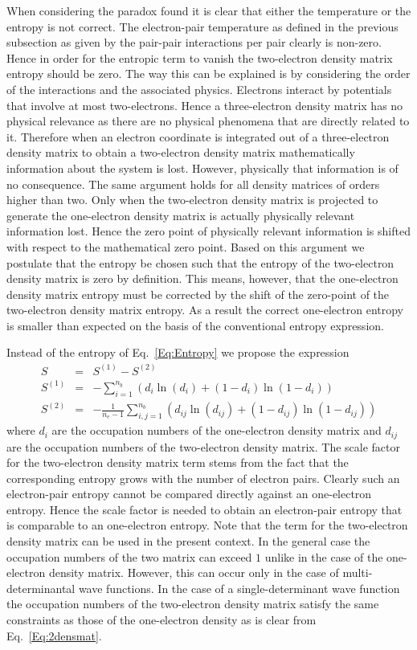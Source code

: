 \documentclass[pra]{revtex4-1}
\begin{document}
When considering the paradox found it is clear that either the temperature
or the entropy is not correct. The electron-pair temperature as defined in the
previous subsection as given by the pair-pair interactions per pair clearly is
non-zero. Hence in order for the entropic term to vanish the two-electron 
density matrix entropy should be zero. The way this can be explained is by
considering the order of the interactions and the associated physics. Electrons
interact by potentials that involve at most two-electrons. Hence a
three-electron density matrix has no physical relevance as there are no 
physical phenomena that are directly related to it. Therefore when an 
electron coordinate is integrated out of a three-electron density matrix to 
obtain a two-electron density matrix mathematically information about the system
is lost. However, physically that information is of no consequence. The same
argument holds for all density matrices of orders higher than two. Only when
the two-electron density matrix is projected to generate the one-electron
density matrix is actually physically relevant information lost. Hence the
zero point of physically relevant information is shifted with respect to the
mathematical zero point. Based on this argument we postulate that the entropy
be chosen such that the entropy of the two-electron density matrix is zero
by definition. This means, however, that the one-electron density matrix 
entropy must be corrected by the shift of the zero-point of the two-electron
density matrix entropy. As a result the correct one-electron entropy is smaller
than expected on the basis of the conventional entropy expression.

Instead of the entropy of Eq.~\ref{Eq:Entropy} we propose the expression
\begin{eqnarray}
   S &=& S^{(1)} - S^{(2)}
   \label{Eq:Entropy12} \\
   S^{(1)} &=& 
     -\sum_{i=1}^{n_b}
         \left(d_i\ln(d_i) + (1-d_i)\ln(1-d_i) \right)
   \label{Eq:Entropy1} \\
   S^{(2)} &=& 
     -   \frac{1}{n_e-1}\sum_{i,j=1}^{n_b}
         \left(d_{ij}\ln(d_{ij}) + (1-d_{ij})\ln(1-d_{ij}) \right)
   \label{Eq:Entropy2}
\end{eqnarray}
where $d_i$ are the occupation numbers of the one-electron density matrix and
$d_{ij}$ are the occupation numbers of the two-electron density matrix.
The scale factor for the two-electron density matrix term stems from the fact
that the corresponding entropy grows with the number of electron pairs. Clearly
such an electron-pair entropy cannot be compared directly against an 
one-electron entropy. Hence the scale factor is needed to obtain an 
electron-pair entropy that is comparable to an one-electron entropy.
Note that the term for the two-electron density matrix can be used in the
present context. In the general case the occupation numbers of the two matrix
can exceed $1$ unlike in the case of the one-electron density matrix. However,
this can occur only in the case of multi-determinantal wave functions. In the
case of a single-determinant wave function the occupation numbers of the 
two-electron density matrix satisfy the same constraints as those of the
one-electron density as is clear from Eq.~\ref{Eq:2densmat}.
\end{document}

